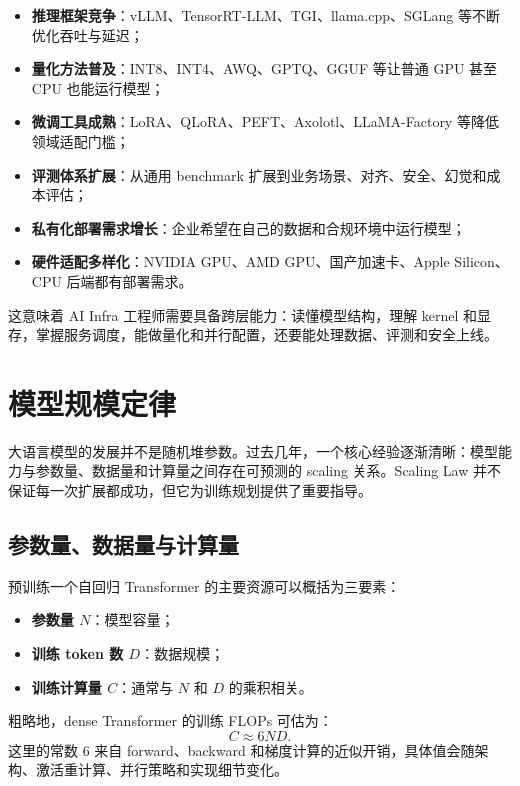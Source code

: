 \begin{itemize}
\item \textbf{推理框架竞争}：vLLM、TensorRT-LLM、TGI、llama.cpp、SGLang 等不断优化吞吐与延迟；
\item \textbf{量化方法普及}：INT8、INT4、AWQ、GPTQ、GGUF 等让普通 GPU 甚至 CPU 也能运行模型；
\item \textbf{微调工具成熟}：LoRA、QLoRA、PEFT、Axolotl、LLaMA-Factory 等降低领域适配门槛；
\item \textbf{评测体系扩展}：从通用 benchmark 扩展到业务场景、对齐、安全、幻觉和成本评估；
\item \textbf{私有化部署需求增长}：企业希望在自己的数据和合规环境中运行模型；
\item \textbf{硬件适配多样化}：NVIDIA GPU、AMD GPU、国产加速卡、Apple Silicon、CPU 后端都有部署需求。
\end{itemize}

这意味着 AI Infra 工程师需要具备跨层能力：读懂模型结构，理解 kernel 和显存，掌握服务调度，能做量化和并行配置，还要能处理数据、评测和安全上线。

\section{模型规模定律}
\label{sec:scaling-laws}

大语言模型的发展并不是随机堆参数。过去几年，一个核心经验逐渐清晰：模型能力与参数量、数据量和计算量之间存在可预测的 scaling 关系。Scaling Law 并不保证每一次扩展都成功，但它为训练规划提供了重要指导。

\subsection{参数量、数据量与计算量}
\label{subsec:params-data-compute}

预训练一个自回归 Transformer 的主要资源可以概括为三要素：

\begin{itemize}
\item \textbf{参数量 $N$}：模型容量；
\item \textbf{训练 token 数 $D$}：数据规模；
\item \textbf{训练计算量 $C$}：通常与 $N$ 和 $D$ 的乘积相关。
\end{itemize}

粗略地，dense Transformer 的训练 FLOPs 可估为：
\[
C\approx 6ND.
\]
这里的常数 $6$ 来自 forward、backward 和梯度计算的近似开销，具体值会随架构、激活重计算、并行策略和实现细节变化。

